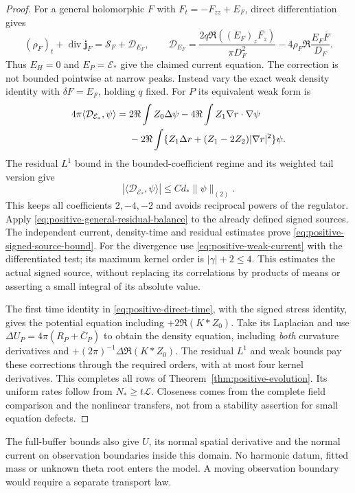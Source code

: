 \begin{proof}
For a general holomorphic $F$ with $F_t=-F_{zz}+E_F$, direct
differentiation gives
\begin{equation}
 (\rho_F)_t+\operatorname{div}\mathbf j_F
 =\mathcal S_F+\mathcal D_{E_F},\qquad
 \mathcal D_{E_F}
 =\frac{2q\Re((E_F)_z\overline{F_z})}{\pi D_F^2}
       -4\rho_F\Re\frac{E_F\overline F}{D_F}.
 \label{eq:positive-general-residual-balance}
\end{equation}
Thus $E_H=0$ and $E_P=\mathcal E_*$ give the claimed current equation.
The correction is not bounded pointwise at narrow peaks.
Instead vary the exact weak density identity with $\delta F=E_F$,
holding $q$ fixed. For $P$ its equivalent weak form is
\begin{align}
 4\pi\langle\mathcal D_{\mathcal E_*},\psi\rangle
 ={}&2\Re\int Z_0\Delta\psi
        -4\Re\int Z_1\nabla r\cdot\nabla\psi\notag\\
 &-2\Re\int\{Z_1\Delta r
                    +(Z_1-2Z_2)|\nabla r|^2\}\psi.
 \label{eq:positive-weak-residual-correction}
\end{align}
The residual $L^1$ bound in the bounded-coefficient regime and its
weighted tail version give
\begin{equation}
 |\langle\mathcal D_{\mathcal E_*},\psi\rangle|
                       \le Cd_*\|\psi\|_{(2)}.
 \label{eq:positive-residual-weak-bound}
\end{equation}
This keeps all coefficients $2,-4,-2$ and avoids reciprocal powers
of the regulator. Apply \eqref{eq:positive-general-residual-balance}
to the already defined signed sources. The independent current,
density-time and residual estimates prove
\eqref{eq:positive-signed-source-bound}. For the divergence use
\eqref{eq:positive-weak-current} with the differentiated test; its
maximum kernel order is $|\gamma|+2\le4$.
This estimates the actual signed source, without replacing its
correlations by products of means or asserting a small integral of
its absolute value.

The first time identity in \eqref{eq:positive-direct-time}, with the
signed stress identity, gives the potential equation including
$+2\Re(K*Z_0)$. Take its Laplacian and use
$\Delta U_P=4\pi(R_P+\overline C_P)$ to obtain the density equation,
including \emph{both} curvature derivatives and
$+(2\pi)^{-1}\Delta\Re(K*Z_0)$.
The residual $L^1$ and weak bounds pay these corrections through the
required orders, with at most four kernel derivatives.
This completes all rows of Theorem~\ref{thm:positive-evolution}.
Its uniform rates follow from $N_*\ge t\mathcal L$.
Closeness comes from the complete field comparison and the nonlinear
transfers, not from a stability assertion for small equation defects.
\end{proof}
The full-buffer bounds also give $U$, its normal spatial derivative
and the normal current on observation boundaries inside this domain.
No harmonic datum, fitted mass or unknown theta root enters the model.
A moving observation boundary would require a separate transport law.

